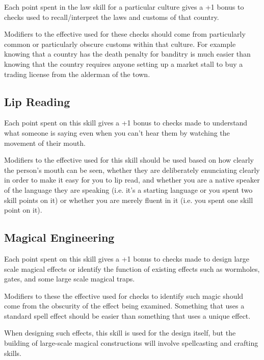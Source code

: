 \begin{multicols*}{2}
Each point spent in the law skill for a particular culture gives a +1 bonus to  checks used to recall/interpret the laws and customs of that country.

Modifiers to the effective  used for these checks should come from particularly common or particularly obscure customs within that culture. For example knowing that a country has the death penalty for banditry is much easier than knowing that the country requires anyone setting up a market stall to buy a trading license from the alderman of the town.

\subsection{Lip Reading}\label{skill:Lip Reading}
Each point spent on this skill gives a +1 bonus to  checks made to understand what someone is saying even when you can’t hear them by watching the movement of their mouth.

Modifiers to the effective  used for this skill should be used based on how clearly the person’s mouth can be seen, whether they are deliberately enunciating clearly in order to make it easy for you to lip read, and whether you are a native speaker of the language they are speaking (i.e. it’s a starting language or you spent two skill points on it) or whether you are merely fluent in it (i.e. you spent one skill point on it).

\subsection{Magical Engineering}\label{skill:Magical Engineering}
Each point spent on this skill gives a +1 bonus to  checks made to design large scale magical effects or identify the function of existing effects such as wormholes, gates, and some large scale magical traps.

Modifiers to these the effective  used for checks to identify such magic should come from the obscurity of the effect being examined. Something that uses a standard spell effect should be easier than something that uses a unique effect.

When designing such effects, this skill is used for the design itself, but the building of large-scale magical constructions will involve spellcasting and crafting skills.


\end{multicols*}
